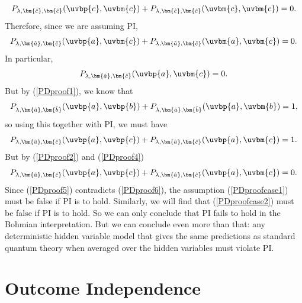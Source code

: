 \documentclass[12pt]{report}
\begin{document}
\begin{equation}
 P_{\lambda,\bm{\hat{c}},\bm{\hat{c}}}(\uvbp{c},\uvbm{c})+P_{\lambda,\bm{\hat{c}},\bm{\hat{c}}}(\uvbm{c},\uvbm{c})=0.
\end{equation}
 Therefore, since we are assuming PI, 
 \begin{equation}
 P_{\lambda,\bm{\hat{a}},\bm{\hat{c}}}(\uvbp{a},\uvbm{c})+P_{\lambda,\bm{\hat{a}},\bm{\hat{c}}}(\uvbm{a},\uvbm{c})=0.
\end{equation}
 In particular, 
  \begin{equation}\label{PDproof4}
  P_{\lambda,\bm{\hat{a}},\bm{\hat{c}}}(\uvbp{a},\uvbm{c})=0.
  \end{equation}
  But by (\ref{PDproof1}), we know that 
  \begin{equation}
  P_{\lambda,\bm{\hat{a}},\bm{\hat{b}}}(\uvbp{a},\uvbp{b})+P_{\lambda,\bm{\hat{a}},\bm{\hat{b}}}(\uvbp{a},\uvbm{b})=1,
  \end{equation}
  so using this together with PI, we must have
    \begin{equation}\label{PDproof5}
  P_{\lambda,\bm{\hat{a}},\bm{\hat{c}}}(\uvbp{a},\uvbp{c})+P_{\lambda,\bm{\hat{a}},\bm{\hat{c}}}(\uvbp{a},\uvbm{c})=1.
  \end{equation}
 But by (\ref{PDproof2}) and (\ref{PDproof4})
\begin{equation}\label{PDproof6}
  P_{\lambda,\bm{\hat{a}},\bm{\hat{c}}}(\uvbp{a},\uvbp{c})+P_{\lambda,\bm{\hat{a}},\bm{\hat{c}}}(\uvbp{a},\uvbm{c})=0.
\end{equation}
Since (\ref{PDproof5}) contradicts (\ref{PDproof6}), the assumption (\ref{PDproofcase1}) must be false if PI is to hold. Similarly, we will find that (\ref{PDproofcase2}) must be false if PI is to hold. So we can only conclude that PI fails to hold in the Bohmian interpretation.   But we can conclude even more than that: any deterministic hidden variable model that gives the same predictions as standard quantum theory when averaged over the hidden variables must violate PI.\label{PIdeterminism} 

  






\section{Outcome Independence\label{OISec}}
\end{document}
